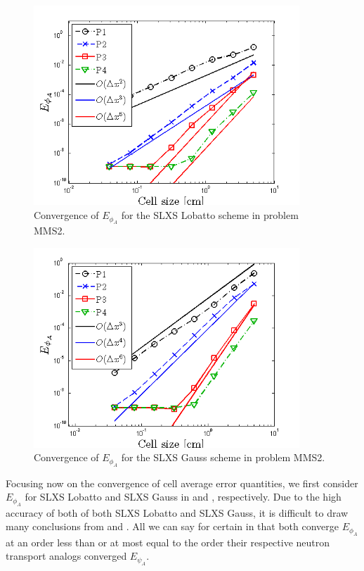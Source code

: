 \begin{figure}[!hbp]
\centering
\includegraphics[width=10cm]{chapter6_grey_radtran/Dissertation_Data/MMS3_SLXS_Initial_SLXS_Lobatto_phi_A.png}
\caption{Convergence of $E_{\phi_A}$ for the SLXS Lobatto scheme in problem MMS2.}
\label{fig:mms3_slxs_lobatto_phi_a}
\end{figure}
%
%
\begin{figure}[!htp]
\centering
\includegraphics[width=10cm]{chapter6_grey_radtran/Dissertation_Data/MMS3_SLXS_Initial_SLXS_Gauss_phi_A.png}
\caption{Convergence of $E_{\phi_A}$ for the SLXS Gauss scheme in problem MMS2.}
\label{fig:mms3_slxs_gauss_phi_a}
\end{figure}
Focusing now on the convergence of cell average error quantities, we first consider $E_{\phi_A}$ for SLXS Lobatto and SLXS Gauss in  and , respectively.
Due to the high accuracy of both of both SLXS Lobatto and SLXS Gauss, it is difficult to draw many conclusions from  and .  All we can say for certain in that both converge $E_{\phi_A}$ at an order less than or at most equal to the order their respective neutron transport analogs converged $E_{\psi_A}$.
